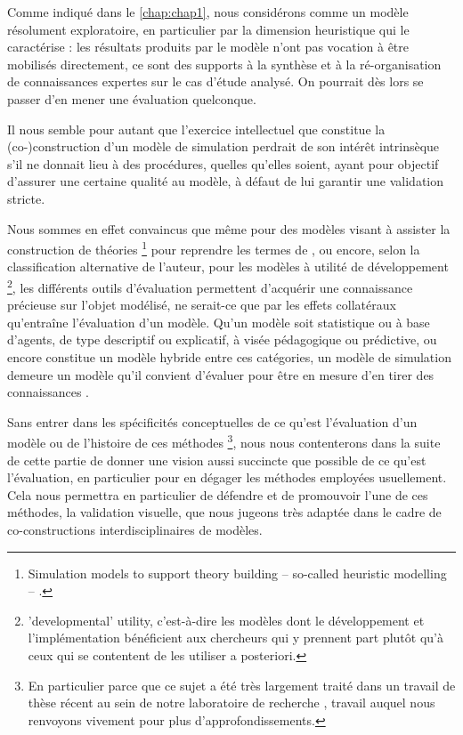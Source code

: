 Comme indiqué dans le \cref{chap:chap1}, nous considérons \simfeodal{} comme un modèle résolument exploratoire, en particulier par la dimension heuristique qui le caractérise : les résultats produits par le modèle n'ont pas vocation à être mobilisés directement, ce sont des supports à la synthèse et à la ré-organisation de connaissances expertes sur le cas d'étude analysé.
On pourrait dès lors se passer d'en mener une évaluation quelconque.

Il nous semble pour autant que l'exercice intellectuel que constitue la (co-)construction d'un modèle de simulation perdrait de son intérêt intrinsèque s'il ne donnait lieu à des procédures, quelles qu'elles soient, ayant pour objectif d'assurer une certaine qualité au modèle, à défaut de lui garantir une validation stricte.

Nous sommes en effet convaincus que même pour des modèles visant à \og assister la construction de théories\fg{}
\footnote{
	\og Simulation models to support theory building -- so-called heuristic modelling -- \textelp{}.\fg{}
} pour reprendre les termes de \textcite[260]{lake_trends_2014}, ou encore, selon la classification alternative de l'auteur, pour les modèles à utilité \og de développement\fg{}
\footnote{
	\og 'developmental' utility\fg{}, c'est-à-dire les modèles dont le développement et l'implémentation bénéficient aux chercheurs qui y prennent part plutôt qu'à ceux qui se contentent de les utiliser a posteriori.
}, les différents outils d'évaluation permettent d'acquérir une connaissance précieuse sur l'objet modélisé, ne serait-ce que par les effets collatéraux qu'entraîne l'évaluation d'un modèle.
Qu'un modèle soit statistique ou à base d'agents, de type descriptif ou explicatif, à visée pédagogique ou prédictive, ou encore constitue un modèle \og hybride\fg{} entre ces catégories, un modèle de simulation demeure un modèle qu'il convient d'évaluer pour être en mesure d'en tirer des connaissances \autocite[299-300]{sargent_history_2017}.

Sans entrer dans les spécificités conceptuelles de ce qu'est l'évaluation d'un modèle ou de l'histoire de ces méthodes
\footnote{
	En particulier parce que ce sujet a été très largement traité dans un travail de thèse récent au sein de notre laboratoire de recherche \autocite[pp. 58--184]{rey-coyrehourcq_plateforme_2015}, travail auquel nous renvoyons vivement pour plus d'approfondissements.
}, nous nous contenterons dans la suite de cette partie de donner une vision aussi succincte que possible de ce qu'est l'évaluation, en particulier pour en dégager les méthodes employées usuellement.
Cela nous permettra en particulier de défendre et de promouvoir l'une de ces méthodes, la validation visuelle, que nous jugeons très adaptée dans le cadre de co-constructions interdisciplinaires de modèles.


